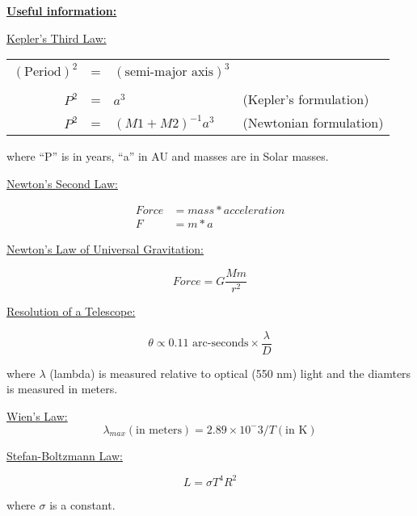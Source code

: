 \pagebreak

\Large{

	\noindent
	\underline{\textbf{Useful information:}}
}

\vspace*{1\baselineskip}

\noindent
\large{\underline{Kepler's Third Law:}}

\normalsize{

	\begin{center}	
	\begin{tabular}{rcll}
		$(\text{Period})^2$ &=& $(\text{semi-major axis})^3$ & \\
		& & &\\
		$P^2$ &=& $a^3$ & (Kepler's formulation) \\
		$P^2$ &=& $(M1 + M2)^{-1} a^3$ & (Newtonian formulation)
	\end{tabular}
	\end{center}

	where ``P'' is in years, ``a'' in AU and masses are in Solar masses.
}

\vspace*{1\baselineskip}
\large{

	\noindent
	\underline{Newton's Second Law:}
}
\normalsize{
	\begin{align*}
		Force &= mass * acceleration \\
		F &= m * a
	\end{align*}
}

\vspace*{1\baselineskip}
\large{

	\noindent
	\underline{Newton's Law of Universal Gravitation:}
}
\normalsize{
	$$Force = G \frac{M m}{r^2}$$
}

\vspace*{1\baselineskip}
\large{

	\noindent
	\underline{Resolution of a Telescope:}
}
\normalsize{
	
	$$ \theta \varpropto \text{0.11 arc-seconds} \times \frac{\lambda}{D}$$

	where $\lambda$ (lambda) is measured relative to optical (550 nm)
	light and the diamters is measured in meters.
}

\vspace*{1\baselineskip}
\large{
	\noindent
	\underline{Wien's Law:}
}
\normalsize{
	$$\lambda_{max}(\text{in meters}) = 2.89 \times 10^-3 \text{/} T (\text{in K})$$
}

\vspace*{1\baselineskip}
\large{
	\noindent
	\underline{Stefan-Boltzmann Law:}
}
\normalsize{
	
	$$L = \sigma T^4 R^2$$

	where $\sigma$ is a constant.
}

